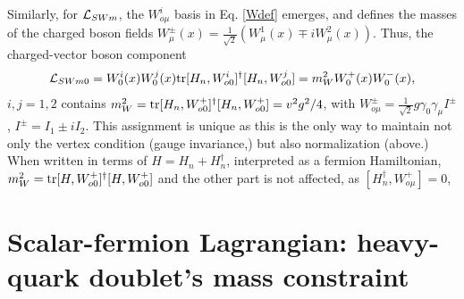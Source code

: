\documentclass[12pt]{article}
\renewcommand\[{\begin{dmath}}
\renewcommand\]{\end{dmath}}
\begin{document}
Similarly,   for ${\cal L}_{SWm}$, the  $W_{o\mu} ^i$ basis   in Eq. \ref{Wdef}
 emerges, and
 defines the masses of the charged boson fields
   $W_\mu^\pm(x)=\frac{1}{\sqrt{2}}(W_\mu^1(x)\mp i W_\mu^2(x))$. Thus,
the    charged-vector boson component  \begin{eqnarray}
\label {WmassEq}{\cal L}_{SWm0}= W_0^{ i}(x)  W_{0}^{j}(x) {\rm tr}[ H_n, W_{o0}^i]^\dagger [H_n, W_{o0}^j] = m_W^2 W^+_0(x)W^-_0(x) , \end{eqnarray}
$i,j=1,2$ contains $ m_W^2={\rm tr}[H_n, W_{o0}^+]^\dagger [H_n, W_{o0}^+]=v^2g^2/4$, with
 $W^\pm _{o\mu}  =\frac{1}{\sqrt{2}}g\gamma_0\gamma_\mu I^\pm$,  $I^\pm=I_1 \pm iI_2$. This assignment is unique as this is the only way to maintain not only the  vertex condition (gauge invariance,)
 but also  normalization (above.)
When written   in terms of $H=H_n + H_n^\dagger $,   interpreted      as a fermion Hamiltonian,
  $ m_W^2={\rm tr}[H , W_{o0}^+]^\dagger[H , W_{o0}^+]$
and the other part is not affected,
 as $[  H_n^\dagger ,W_{o\mu}^+ ]=0$,



\section{Scalar-fermion Lagrangian: heavy-quark doublet's mass constraint }
\end{document}
